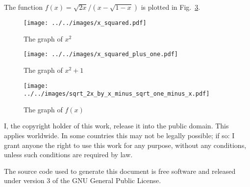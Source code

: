 \documentclass{article}
\begin{document}
    The function $f(x)=\sqrt{2x}/(x-\sqrt{1-x})$ is plotted in
    Fig.~\ref{fig:sqrt_2x_by_x_minus_sqrt_one_minus_x}.
    \begin{figure}
        \centering
        \texttt{[image: ../../images/x\_squared.pdf]}
        \caption{The graph of $x^{2}$}
        \label{fig:x_squared}
    \end{figure}
    \begin{figure}
        \centering
        \texttt{[image: ../../images/x\_squared\_plus\_one.pdf]}
        \caption{The graph of $x^{2}+1$}
        \label{fig:x_squared_plus_one}
    \end{figure}
    \begin{figure}
        \centering
        \texttt{[image: ../../images/sqrt\_2x\_by\_x\_minus\_sqrt\_one\_minus\_x.pdf]}
        \caption{The graph of $f(x)$}
        \label{fig:sqrt_2x_by_x_minus_sqrt_one_minus_x}
    \end{figure}
    \newpage
    I, the copyright holder of this work, release it into the public domain.
    This applies worldwide. In some countries this may not be legally possible;
    if so: I grant anyone the right to use this work for any purpose, without
    any conditions, unless such conditions are required by law.
    \par\hfill\par
    The source code used to generate this document is free software and released
    under version 3 of the GNU General Public License.
\end{document}
